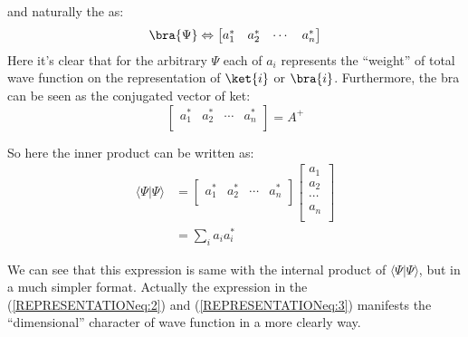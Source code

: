 and naturally the \brat{\Psi} as:
\begin{equation}\label{REPRESENTATIONeq:3}
\bra{\Psi} \Leftrightarrow
\begin{bmatrix}
a_{1}^{*} & a_{2}^{*} &  \cdots   & a_{n}^{*} \\
\end{bmatrix}
\end{equation}
Here it's clear that for the arbitrary $\Psi$ each of $a_{i}$
represents the ``weight'' of total wave function on the
representation of $\ket{i}$ or $\bra{i}$. Furthermore, the bra can
be seen as the conjugated vector of ket:
\begin{equation}\label{}
\begin{bmatrix}
a_{1}^{*} & a_{2}^{*} &  \cdots   & a_{n}^{*} \\
\end{bmatrix}
= A^{+}
\end{equation}

So here the inner product can be written as:
\begin{align}\label{REPRESENTATIONeq:4}
\langle\Psi|\Psi\rangle &= \begin{bmatrix}
                            a_{1}^{*} & a_{2}^{*} & \cdots & a_{n}^{*} \\
                          \end{bmatrix}
                          \begin{bmatrix}
                          a_{1} \\
                          a_{2} \\
                          \cdots   \\
                          a_{n} \\
                          \end{bmatrix} \nonumber \\
                       &= \sum_{i}a_{i}a_{i}^{*}
\end{align}

We can see that this expression is same with the internal product of
$\langle\Psi|\Psi\rangle$,  but in a much simpler format. Actually
the expression in the (\ref{REPRESENTATIONeq:2}) and
(\ref{REPRESENTATIONeq:3}) manifests the ``dimensional'' character
of wave function in a more clearly way.

